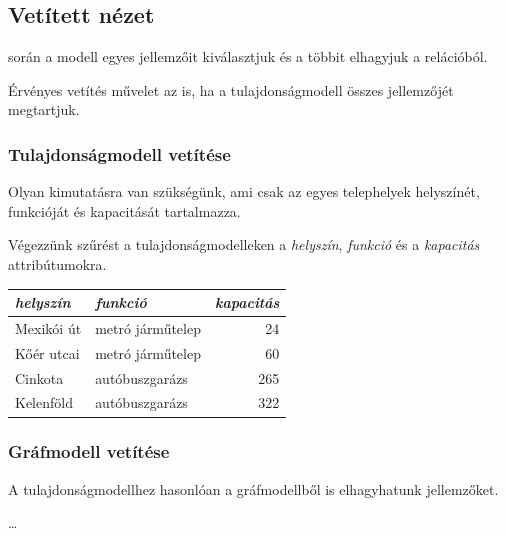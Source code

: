 \subsection{Vetített nézet}

\begin{definicio}
	 során a modell egyes jellemzőit kiválasztjuk és a többit elhagyjuk a relációból.

\begin{megjegyzes}
	Érvényes vetítés művelet az is, ha a tulajdonságmodell összes jellemzőjét megtartjuk.
\end{megjegyzes}
\end{definicio}

\subsubsection{Tulajdonságmodell vetítése}

\begin{pelda}
	Olyan kimutatásra van szükségünk, ami csak az egyes telephelyek helyszínét, funkcióját és kapacitását tartalmazza.
\end{pelda}

Végezzünk szűrést a tulajdonságmodelleken a \textit{helyszín}, \textit{funkció} és a \textit{kapacitás} attribútumokra.

\begin{table}[H]
	\sf
	\centering
	\begin{tabular}{llr}
		\toprule
		\it helyszín & \it funkció      & \it kapacitás \\ \midrule
		Mexikói út   & metró járműtelep &            24 \\
		Kőér utcai   & metró járműtelep &            60 \\
		Cinkota      & autóbuszgarázs   &           265 \\
		Kelenföld    & autóbuszgarázs   &           322 \\ \bottomrule
	\end{tabular}
\end{table}

\subsubsection{Gráfmodell vetítése}

A tulajdonságmodellhez hasonlóan a gráfmodellből is elhagyhatunk jellemzőket.

\begin{pelda}
	\ldots
\end{pelda}

